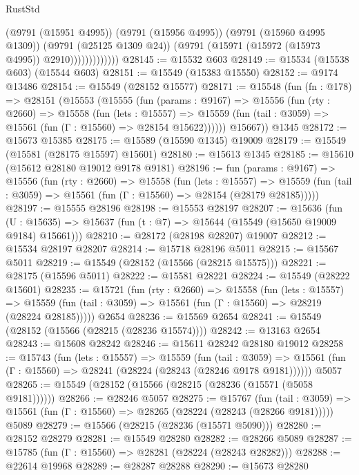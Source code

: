 \begin{lexlean}{RustStd}
\begin{coremodule}
                          (@9791 (@15951 @4995))
                          (@9791 (@15956 @4995))
                          (@9791 (@15960 @4995 @1309))
                          (@9791 (@25125 @1309 @24))
                          (@9791 (@15971 (@15972 (@15973 @4995)) @2910)))))))))))))
@28145 := @15532 @603
@28149 := @15534 (@15538 @603) (@15544 @603)
@28151 := @15549 (@15383 @15550)
@28152 := @9174 @13486
@28154 := @15549 (@28152 @15577)
@28171 := @15548
    (fun (fn : @178) =>
    @28151
      (@15553
        (@15555
          (fun (params : @9167) =>
          @15556
            (fun (rty : @2660) =>
            @15558
              (fun (lets : @15557) =>
              @15559 (fun (tail : @3059) => @15561 (fun (Γ : @15560) => @28154 @15622))))))
        @15667))
    @1345
@28172 := @15673 @15385
@28175 := @15589 (@15590 @1345) @19009
@28179 := @15549 (@15581 (@28175 @15597) @15601)
@28180 := @15613 @1345
@28185 := @15610 (@15612 @28180 @19012 @9178 @9181)
@28196 := fun (params : @9167) =>
  @15556
    (fun (rty : @2660) =>
    @15558
      (fun (lets : @15557) =>
      @15559 (fun (tail : @3059) => @15561 (fun (Γ : @15560) => @28154 (@28179 @28185)))))
@28197 := @15555 @28196
@28198 := @15553 @28197
@28207 := @15636
    (fun (U : @15635) => @15637 (fun (t : @7) => @15644 (@15549 (@15650 @19009 @9184) @15661)))
@28210 := @28172 (@28198 @28207) @19007
@28212 := @15534 @28197 @28207
@28214 := @15718 @28196 @5011
@28215 := @15567 @5011
@28219 := @15549 (@28152 (@15566 (@28215 @15575)))
@28221 := @28175 (@15596 @5011)
@28222 := @15581 @28221
@28224 := @15549 (@28222 @15601)
@28235 := @15721
    (fun (rty : @2660) =>
    @15558
      (fun (lets : @15557) =>
      @15559 (fun (tail : @3059) => @15561 (fun (Γ : @15560) => @28219 (@28224 @28185)))))
    @2654
@28236 := @15569 @2654
@28241 := @15549 (@28152 (@15566 (@28215 (@28236 @15574))))
@28242 := @13163 @2654
@28243 := @15608 @28242
@28246 := @15611 @28242 @28180 @19012
@28258 := @15743
    (fun (lets : @15557) =>
    @15559
      (fun (tail : @3059) =>
      @15561 (fun (Γ : @15560) => @28241 (@28224 (@28243 (@28246 @9178 @9181))))))
    @5057
@28265 := @15549 (@28152 (@15566 (@28215 (@28236 (@15571 (@5058 @9181))))))
@28266 := @28246 @5057
@28275 := @15767
    (fun (tail : @3059) => @15561 (fun (Γ : @15560) => @28265 (@28224 (@28243 (@28266 @9181)))))
    @5089
@28279 := @15566 (@28215 (@28236 (@15571 @5090)))
@28280 := @28152 @28279
@28281 := @15549 @28280
@28282 := @28266 @5089
@28287 := @15785 (fun (Γ : @15560) => @28281 (@28224 (@28243 @28282)))
@28288 := @22614 @19968
@28289 := @28287 @28288
@28290 := @15673 @28280

\end{coremodule}
\end{lexlean}
